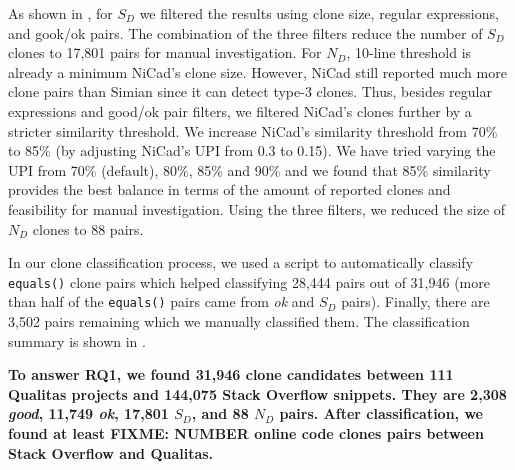 \documentclass{sig-alternate-05-2015}
\newcommand\FIXME[1]{\textbf{FIXME: #1}}
\begin{document}
As shown in , for $S_D$ we filtered the results using clone size, regular expressions, and gook/ok pairs. The combination of the three filters reduce the number of $S_D$ clones to 17,801 pairs for manual investigation. 
For $N_D$, 10-line threshold is already a minimum NiCad's clone size. However, NiCad still reported much more clone pairs than Simian since it can detect type-3 clones. Thus, besides regular expressions and good/ok pair filters, we filtered NiCad's clones further by a stricter similarity threshold. We increase NiCad's similarity threshold from 70\% to 85\% (by adjusting NiCad's $\mathrm{UPI}$ from 0.3 to 0.15). We have tried varying the UPI from 70\% (default), 80\%, 85\% and 90\% and we found that 85\% similarity provides the best balance in terms of the amount of reported clones and feasibility for manual investigation. Using the three filters, we reduced the size of $N_D$ clones to 88 pairs.

In our clone classification process, we used a script to automatically classify \texttt{equals()} clone pairs which helped classifying 28,444 pairs out of 31,946 (more than half of the \texttt{equals()} pairs came from \textit{ok} and $S_D$ pairs). Finally, there are 3,502 pairs remaining which we manually classified them. The classification summary is shown in .

\textbf{To answer RQ1, we found 31,946 clone candidates between 111 Qualitas projects and 144,075 Stack Overflow snippets. They are 2,308 \textit{good}, 11,749 \textit{ok}, 17,801 $S_D$, and 88 $N_D$ pairs. After classification, we found at least \FIXME{NUMBER} online code clones pairs between Stack Overflow and Qualitas.}

\end{document}
